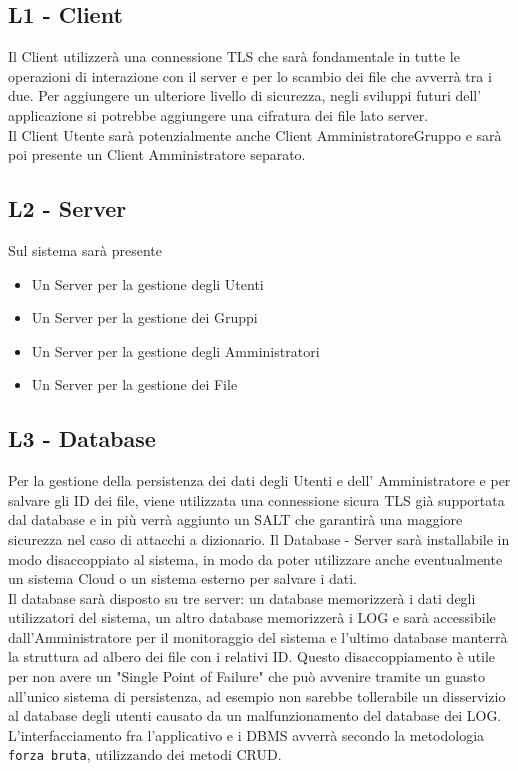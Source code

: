 \subsection*{L1 - Client}
Il Client utilizzerà una connessione TLS che sarà fondamentale in tutte le operazioni di interazione con il server e per lo scambio dei file che avverrà tra i due.
Per aggiungere un ulteriore livello di sicurezza, negli sviluppi futuri dell' applicazione si potrebbe aggiungere una cifratura dei file lato server.
\\
Il Client Utente sarà potenzialmente anche Client AmministratoreGruppo e sarà poi presente un Client Amministratore separato.
\vspace{0.5cm}

\subsection*{L2 - Server}
\vspace{0.5cm}
Sul sistema sarà presente
\begin{itemize}
\item Un Server per la gestione degli Utenti
\item Un Server per la gestione dei Gruppi
\item Un Server per la gestione degli Amministratori
\item Un Server per la gestione dei File
\end{itemize}
\subsection*{L3 - Database}
Per la gestione della persistenza dei dati degli Utenti e dell' Amministratore e per salvare gli ID dei file, viene utilizzata una connessione sicura TLS già supportata dal database e in più verrà aggiunto un SALT che garantirà una maggiore sicurezza nel caso di attacchi a dizionario.
Il Database - Server sarà installabile in modo disaccoppiato al sistema, in modo da poter utilizzare anche eventualmente un sistema Cloud o un sistema esterno per salvare i dati.
\\
Il database sarà disposto su tre server: un database memorizzerà i dati degli utilizzatori del sistema, un altro database memorizzerà i LOG e sarà accessibile dall'Amministratore per il monitoraggio del sistema e l'ultimo database manterrà la struttura ad albero dei file con i relativi ID.
Questo disaccoppiamento è utile per non avere un "Single Point of Failure" che può avvenire tramite un guasto all'unico sistema di persistenza, ad esempio non sarebbe tollerabile un disservizio al database degli utenti causato da un malfunzionamento del database dei LOG.
\\
L'interfacciamento fra l'applicativo e i DBMS avverrà secondo la metodologia \verb|forza bruta|, utilizzando dei metodi CRUD.

